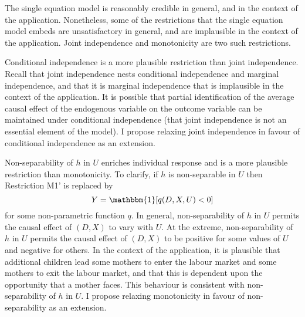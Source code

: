 \documentclass[12pt,a4paper,twoside]{article}
\numberwithin{equation}{section}
\begin{document}
The single equation model is reasonably credible in general, and in the context of the application. Nonetheless, some of the restrictions that the single equation model embeds are unsatisfactory in general, and are implausible in the context of the application. Joint independence and monotonicity are two such restrictions. 

Conditional independence is a more plausible restriction than joint independence. Recall that joint independence nests conditional independence and marginal independence, and that it is marginal independence that is implausible in the context of the application. It is possible that partial identification of the average causal effect of the endogenous variable on the outcome variable can be maintained under conditional independence (that joint independence is not an essential element of the model). I propose relaxing joint independence in favour of conditional independence as an extension.

Non-separability of $h$ in $U$ enriches individual response and is a more plausible restriction than monotonicity. To clarify, if $h$ is non-separable in $U$ then Restriction M1' is replaced by  
\[Y=\mathbbm{1}[q(D,X,U)<0]\]
for some non-parametric function $q$. In general, non-separability of $h$ in $U$ permits the causal effect of $(D,X)$ to vary with $U$. At the extreme, non-separability of $h$ in $U$ permits the causal effect of $(D,X)$ to be positive for some values of $U$ and negative for others. In the context of the application, it is plausible that additional children lead some mothers to enter the labour market and some mothers to exit the labour market, and that this is dependent upon the opportunity that a mother faces. This behaviour is consistent with non-separability of $h$ in $U$. I propose relaxing monotonicity in favour of non-separability as an extension.
\end{document}
